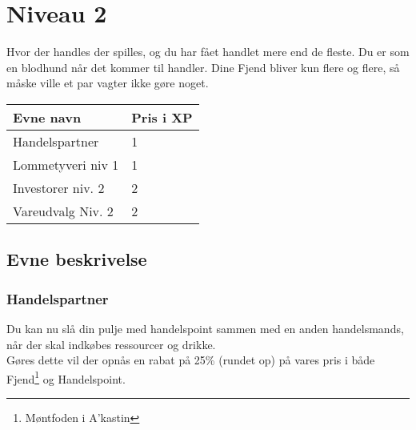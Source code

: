 \chapter{Niveau 2}
Hvor der handles der spilles, og du har fået handlet mere end de fleste. Du er som en blodhund når det kommer til handler. Dine Fjend bliver kun flere og flere, så måske ville et par vagter ikke gøre noget.

\begin{table}[H]
    \centering
    \begin{tabular}{|p{}|p{}|}
    \rowcolor{cerulean!80}\hline
        Evne navn & Pris i XP \\\hline
         Handelspartner & 1 \\\hline
         Lommetyveri niv 1 & 1\\\hline
         Investorer niv. 2 & 2 \\\hline
         Vareudvalg Niv. 2 & 2 \\\hline
    \end{tabular}
\end{table}
\section{Evne beskrivelse}

\subsection{Handelspartner}
Du kan nu slå din pulje med handelspoint sammen med en anden handelsmands, når der skal indkøbes ressourcer og drikke.\\
Gøres dette vil der opnås en rabat på 25\% (rundet op) på vares pris i både Fjend\footnote{Møntfoden i A'kastin} og Handelspoint.






